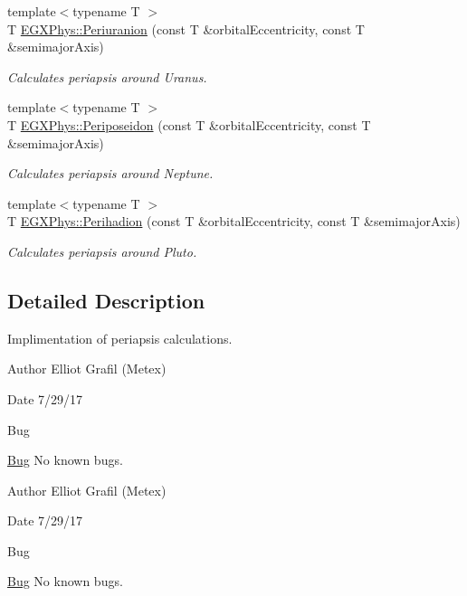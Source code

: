 \begin{DoxyCompactItemize}
{\footnotesize template$<$typename T $>$ }\\T \hyperlink{group___astrophysics_gab8b8131a617dd2d2a4de1d48accd7442}{E\+G\+X\+Phys\+::\+Periuranion} (const T \&orbital\+Eccentricity, const T \&semimajor\+Axis)
\begin{DoxyCompactList}\small\item\em Calculates periapsis around Uranus. \end{DoxyCompactList}\item 
{\footnotesize template$<$typename T $>$ }\\T \hyperlink{group___astrophysics_ga237e7af3794202c67e65f64f4c8abc2a}{E\+G\+X\+Phys\+::\+Periposeidon} (const T \&orbital\+Eccentricity, const T \&semimajor\+Axis)
\begin{DoxyCompactList}\small\item\em Calculates periapsis around Neptune. \end{DoxyCompactList}\item 
{\footnotesize template$<$typename T $>$ }\\T \hyperlink{group___astrophysics_gafb16e46e55078b38604eef0d7c7c40c4}{E\+G\+X\+Phys\+::\+Perihadion} (const T \&orbital\+Eccentricity, const T \&semimajor\+Axis)
\begin{DoxyCompactList}\small\item\em Calculates periapsis around Pluto. \end{DoxyCompactList}\end{DoxyCompactItemize}


\subsection{Detailed Description}
Implimentation of periapsis calculations. 

\begin{DoxyAuthor}{Author}
Elliot Grafil (Metex) 
\end{DoxyAuthor}
\begin{DoxyDate}{Date}
7/29/17 
\end{DoxyDate}
\begin{DoxyRefDesc}{Bug}
\item[\hyperlink{bug__bug000010}{Bug}]No known bugs. \end{DoxyRefDesc}


\begin{DoxyAuthor}{Author}
Elliot Grafil (Metex) 
\end{DoxyAuthor}
\begin{DoxyDate}{Date}
7/29/17 
\end{DoxyDate}
\begin{DoxyRefDesc}{Bug}
\item[\hyperlink{bug__bug000016}{Bug}]No known bugs. \end{DoxyRefDesc}
